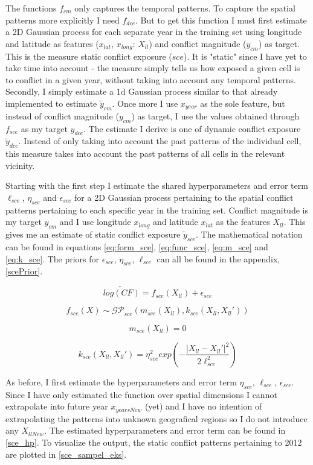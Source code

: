 \documentclass[a4paper]{article}
\begin{document}
The functions $f_{cm}$ only captures the temporal patterns. To capture the spatial patterns more explicitly I need $f_{dce}$. But to get this function I must first estimate a 2D Gaussian process for each separate year in the training set using longitude and latitude as features ($x_{lat}$, $x_{long}$: $X_{ll}$) and conflict magnitude ($y_{cm}$) as target. This is the measure static conflict exposure ($sce$). It is "static" since I have yet to take time into account - the measure simply tells us how exposed a given cell is to conflict in a given year, without taking into account any temporal patterns. Secondly, I simply estimate a 1d Gaussian process similar to that already implemented to estimate $\tilde{y}_{cm}$. Once more I use $x_{year}$ as the sole feature, but instead of conflict magnitude ($y_{cm}$) as target, I use the values obtained through $f_{sce}$ as my target $y_{dce}$. The estimate I derive is one of dynamic conflict exposure $\tilde{y}_{dce}$. Instead of only taking into account the past patterns of the individual cell, this measure takes into account the past patterns of all cells in the relevant vicinity.\par 

Starting with the first step I estimate the shared hyperparameters and error term $\ell_{sce}$, $\eta_{sce}$ and $\epsilon_{sce}$ for a 2D Gaussian process pertaining to the spatial conflict patterns pertaining to each specific year in the training set. Conflict magnitude is my target $y_{cm}$ and I use longitude $x_{long}$ and latitude $x_{lat}$ as the features $X_{ll}$. This gives me an estimate of static conflict exposure $\tilde{y}_{sce}$. The mathematical notation can be found in equations \ref{eq:form_sce}, \ref{eq:func_sce}, \ref{eq:m_sce} and \ref{eq:k_sce}.  The priors for $\epsilon_{sce}$, $\eta_{sce}$, $\ell_{sce}$ can all be found in the appendix, \autoref{scePrior}.\par

\[
\widetilde{log(CF)} = f_{sce}(X_{ll}) + \epsilon_{sce} \tag{23} \label{eq:form_sce}
\]

\[
f_{sce}(X) \sim \mathcal{GP}_{sce}(m_{sce}(X_{ll}),k_{sce}(X_{ll},X_{ll}')) \tag{24} \label{eq:func_sce}
\]

\[
m_{sce}(X_{ll}) = 0 \tag{25} \label{eq:m_sce}
\]

\[
k_{sce}(X_{ll},X_{ll}') = \eta_{sce}^2 exp\left(-\frac{|X_{ll}-X_{ll}'|^2}{2\ell_{sce}^2}\right) \tag{26} \label{eq:k_sce}
\]

As before, I first estimate the hyperparameters and error term $\eta_{sce}$, $\ell_{sce}$, $\epsilon_{sce}$. Since I have only estimated the function over spatial dimensions I cannot extrapolate into future year $x_{yearsNew}$ (yet) and I have no intention of extrapolating the patterns into unknown geografical regions so I do not introduce any $X_{llNew}$. The estimated hyperparameters and error term can be found in \autoref{sce_hp}. To visualize the output, the static conflict patterns pertaining to 2012 are plotted in \autoref{sce_sampel_eks}.\par
\end{document}
